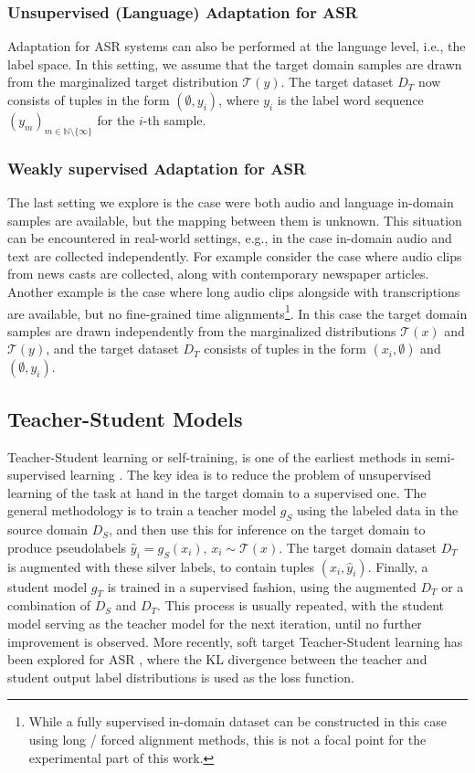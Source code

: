\documentclass[journal]{IEEEtran}
\begin{document}
\subsubsection{Unsupervised (Language) Adaptation for ASR}
\label{sec:unsup-lang-prob}
Adaptation for ASR systems can also be performed at the language level, i.e., the label space. In this setting, we assume that the target domain samples are drawn from the marginalized target distribution $\mathcal{T}(y)$. The target dataset $D_T$ now consists of tuples in the form $(\emptyset, y_i)$, where $y_i$ is the label word sequence $(y_m)_{m\in \mathbb{N} \setminus \{\infty\}}$ for the $i$-th sample.

\subsubsection{Weakly supervised Adaptation for ASR}
\label{sec:weak-lang-prob}
The last setting we explore is the case were both audio and language in-domain samples are available, but the mapping between them is unknown. This situation can be encountered in real-world settings, e.g., in the case in-domain audio and text are collected independently. For example consider the case where audio clips from news casts are collected, along with contemporary newspaper articles. Another example is the case where long audio clips alongside with transcriptions are available, but no fine-grained time alignments\footnote{While a fully supervised in-domain dataset can be constructed in this case using long / forced alignment methods, this is not a focal point for the experimental part of this work.}.
In this case the target domain samples are drawn independently from the marginalized distributions  $\mathcal{T}(x)$ and  $\mathcal{T}(y)$, and the target dataset $D_T$ consists of tuples in the form $(x_i, \emptyset)$ and $(\emptyset, y_i)$.


\subsection{Teacher-Student Models}
\label{sec:teacher}

Teacher-Student learning or self-training, is one of the earliest methods in semi-supervised learning \cite{selftrain1,selftrain2,selftrain3}.
The key idea is to reduce the problem of unsupervised learning of the task at hand in the target domain to a supervised one. The general methodology is to train a teacher model $g_S$ using the labeled data in the source domain $D_S$, and then use this for inference on the target domain to produce pseudolabels $\hat{y}_i = g_S(x_i), \, x_i \sim \mathcal{T}(x)$. The target domain dataset $D_T$ is augmented with these silver labels, to contain tuples $(x_i, \hat{y}_i)$. Finally, a student model $g_T$ is trained in a supervised fashion, using the augmented $D_T$ or a combination of $D_S$ and $D_T$. This process is usually repeated, with the student model serving as the teacher model for the next iteration, until no further improvement is observed.
More recently, soft target
Teacher-Student learning has been explored for ASR \cite{selftrainSoft1, selftrainSoft2, sleftrainSoft3}, where the KL divergence between the teacher and student output label distributions
is used as the loss function.
\end{document}
